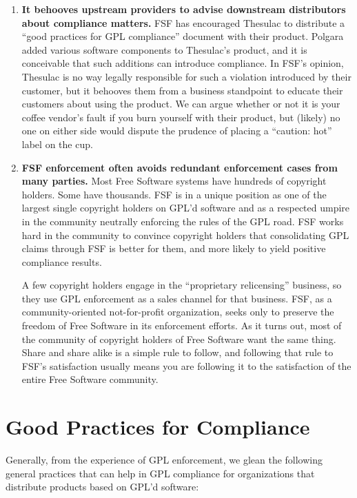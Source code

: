 \documentclass[12pt]{report}
\begin{document}
\begin{enumerate}
\item {\bf It behooves upstream providers to advise downstream
  distributors about compliance matters.}  FSF has encouraged Thesulac to
  distribute a ``good practices for GPL compliance'' document with their
  product.  Polgara added various software components to Thesulac's
  product, and it is conceivable that such additions can introduce
  compliance.  In FSF's opinion, Thesulac is no way legally responsible
  for such a violation introduced by their customer, but it behooves them
  from a business standpoint to educate their customers about using the
  product.  We can argue whether or not it is your coffee vendor's fault
  if you burn yourself with their product, but (likely) no one on either
  side would dispute the prudence of placing a ``caution: hot'' label on
  the cup.

\item {\bf FSF enforcement often avoids redundant enforcement cases from
  many parties.}  Most Free Software systems have hundreds of copyright
  holders.  Some have thousands.  FSF is in a unique position as one of
  the largest single copyright holders on GPL'd software and as a
  respected umpire in the community neutrally enforcing the rules of the
  GPL road.  FSF works hard in the community to convince copyright
  holders that consolidating GPL claims through FSF is better for them,
  and more likely to yield positive compliance results.

  A few copyright holders engage in the ``proprietary relicensing''
  business, so they use GPL enforcement as a sales channel for that
  business.  FSF, as a community-oriented not-for-profit organization,
  seeks only to preserve the freedom of Free Software in its enforcement
  efforts.  As it turns out, most of the community of copyright holders
  of Free Software want the same thing.  Share and share alike is a
  simple rule to follow, and following that rule to FSF's satisfaction
  usually means you are following it to the satisfaction of the entire
  Free Software community.
\end{enumerate}

\chapter{Good Practices for Compliance}

Generally, from the experience of GPL enforcement, we glean the following
general practices that can help in GPL compliance for organizations that
distribute products based on GPL'd software:
\end{document}
